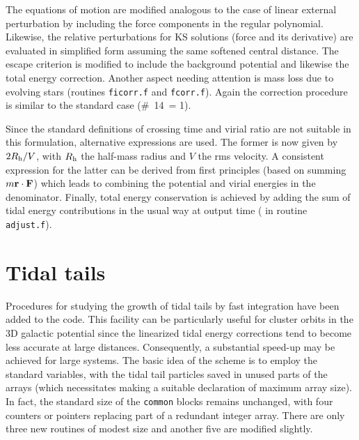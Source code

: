 \documentclass[12pt]{article}
\begin{document}
The equations of motion are modified analogous to the case of linear
external perturbation by including the force components in the regular
polynomial.
Likewise, the relative perturbations for KS solutions (force and its
derivative) are evaluated in simplified form assuming the same softened
central distance.
The escape criterion is modified to include the background potential
and likewise the total energy correction.
Another aspect needing attention is mass loss due to evolving stars
(routines {\tt ficorr.f} and {\tt fcorr.f}).
Again the correction procedure is similar to the standard case
(\#~14~= 1).

Since the standard definitions of crossing time and virial ratio are
not suitable in this formulation, alternative expressions are used.
The former is now given by $2 R_{\rm h}/V$, with $R_{\rm h}$ the
half-mass radius and $V$ the rms velocity.
A consistent expression for the latter can be derived from first principles
(based on summing $m {\bf r} \cdot {\bf F}$) which leads to combining the
potential and virial energies in the denominator.
Finally, total energy conservation is achieved by adding the sum of tidal
energy contributions in the usual way at output time ( in
routine {\tt adjust.f}).

\section{Tidal tails}

Procedures for studying the growth of tidal tails by fast integration have
been added to the code.
This facility can be particularly useful for cluster orbits in the 3D
galactic potential since the linearized tidal energy corrections tend to
become less accurate at large distances.
Consequently, a substantial speed-up may be achieved for large systems.
The basic idea of the scheme is to employ the standard variables, with
the tidal tail particles saved in unused parts of the arrays (which
necessitates making a suitable declaration of maximum array size).
In fact, the standard size of the {\tt common} blocks remains unchanged,
with four counters or pointers replacing part of a redundant integer array.
There are only three new routines of modest size and another five are
modified slightly.
\end{document}
